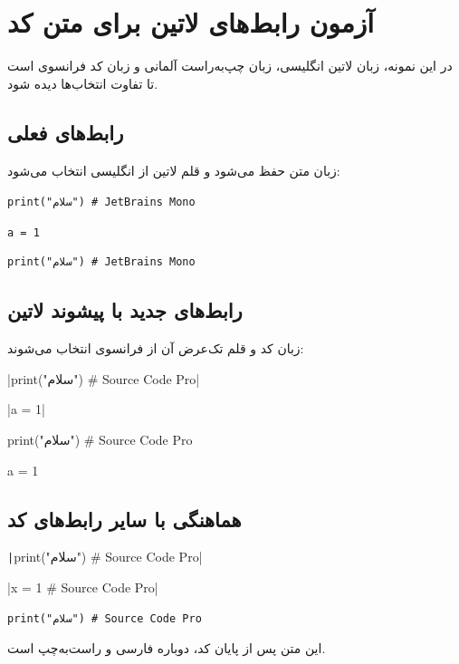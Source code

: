 \documentclass[12pt]{article}
\begin{document}
\section*{آزمون رابط‌های لاتین برای متن کد}
در این نمونه، زبان لاتین انگلیسی، زبان چپ‌به‌راست آلمانی و زبان کد
فرانسوی است تا تفاوت انتخاب‌ها دیده شود.

\subsection*{رابط‌های فعلی}
زبان متن حفظ می‌شود و قلم لاتین از انگلیسی انتخاب می‌شود:

\verb|print("سلام") # JetBrains Mono|

\verb*|a = 1|

\begin{verbatim}
print("سلام") # JetBrains Mono
\end{verbatim}

\subsection*{رابط‌های جدید با پیشوند لاتین}
زبان کد و قلم تک‌عرض آن از فرانسوی انتخاب می‌شوند:

\latinverb|print("سلام") # Source Code Pro|

\latinverb*|a = 1|

\begin{latinverbatim}
print("سلام") # Source Code Pro
\end{latinverbatim}
\begin{latinverbatim*}
a = 1
\end{latinverbatim*}

\subsection*{هماهنگی با سایر رابط‌های کد}
\texttt|print("سلام") # Source Code Pro|

\generatedinline|x = 1 # Source Code Pro|

\begin{verbatim}
print("سلام") # Source Code Pro
\end{verbatim}

این متن پس از پایان کد، دوباره فارسی و راست‌به‌چپ است.
\end{document}
